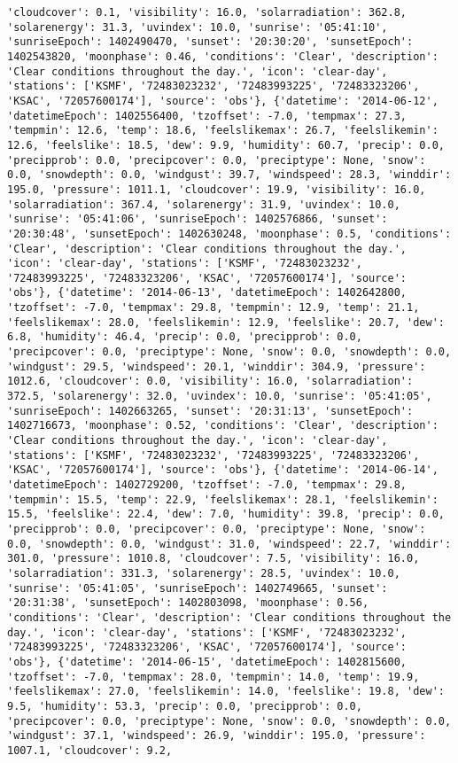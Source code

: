 \documentclass[
  letterpaper,
  DIV=11,
  numbers=noendperiod]{scrartcl}
\begin{document}
\begin{verbatim}
'cloudcover': 0.1, 'visibility': 16.0, 'solarradiation': 362.8, 'solarenergy': 31.3, 'uvindex': 10.0, 'sunrise': '05:41:10', 'sunriseEpoch': 1402490470, 'sunset': '20:30:20', 'sunsetEpoch': 1402543820, 'moonphase': 0.46, 'conditions': 'Clear', 'description': 'Clear conditions throughout the day.', 'icon': 'clear-day', 'stations': ['KSMF', '72483023232', '72483993225', '72483323206', 'KSAC', '72057600174'], 'source': 'obs'}, {'datetime': '2014-06-12', 'datetimeEpoch': 1402556400, 'tzoffset': -7.0, 'tempmax': 27.3, 'tempmin': 12.6, 'temp': 18.6, 'feelslikemax': 26.7, 'feelslikemin': 12.6, 'feelslike': 18.5, 'dew': 9.9, 'humidity': 60.7, 'precip': 0.0, 'precipprob': 0.0, 'precipcover': 0.0, 'preciptype': None, 'snow': 0.0, 'snowdepth': 0.0, 'windgust': 39.7, 'windspeed': 28.3, 'winddir': 195.0, 'pressure': 1011.1, 'cloudcover': 19.9, 'visibility': 16.0, 'solarradiation': 367.4, 'solarenergy': 31.9, 'uvindex': 10.0, 'sunrise': '05:41:06', 'sunriseEpoch': 1402576866, 'sunset': '20:30:48', 'sunsetEpoch': 1402630248, 'moonphase': 0.5, 'conditions': 'Clear', 'description': 'Clear conditions throughout the day.', 'icon': 'clear-day', 'stations': ['KSMF', '72483023232', '72483993225', '72483323206', 'KSAC', '72057600174'], 'source': 'obs'}, {'datetime': '2014-06-13', 'datetimeEpoch': 1402642800, 'tzoffset': -7.0, 'tempmax': 29.8, 'tempmin': 12.9, 'temp': 21.1, 'feelslikemax': 28.0, 'feelslikemin': 12.9, 'feelslike': 20.7, 'dew': 6.8, 'humidity': 46.4, 'precip': 0.0, 'precipprob': 0.0, 'precipcover': 0.0, 'preciptype': None, 'snow': 0.0, 'snowdepth': 0.0, 'windgust': 29.5, 'windspeed': 20.1, 'winddir': 304.9, 'pressure': 1012.6, 'cloudcover': 0.0, 'visibility': 16.0, 'solarradiation': 372.5, 'solarenergy': 32.0, 'uvindex': 10.0, 'sunrise': '05:41:05', 'sunriseEpoch': 1402663265, 'sunset': '20:31:13', 'sunsetEpoch': 1402716673, 'moonphase': 0.52, 'conditions': 'Clear', 'description': 'Clear conditions throughout the day.', 'icon': 'clear-day', 'stations': ['KSMF', '72483023232', '72483993225', '72483323206', 'KSAC', '72057600174'], 'source': 'obs'}, {'datetime': '2014-06-14', 'datetimeEpoch': 1402729200, 'tzoffset': -7.0, 'tempmax': 29.8, 'tempmin': 15.5, 'temp': 22.9, 'feelslikemax': 28.1, 'feelslikemin': 15.5, 'feelslike': 22.4, 'dew': 7.0, 'humidity': 39.8, 'precip': 0.0, 'precipprob': 0.0, 'precipcover': 0.0, 'preciptype': None, 'snow': 0.0, 'snowdepth': 0.0, 'windgust': 31.0, 'windspeed': 22.7, 'winddir': 301.0, 'pressure': 1010.8, 'cloudcover': 7.5, 'visibility': 16.0, 'solarradiation': 331.3, 'solarenergy': 28.5, 'uvindex': 10.0, 'sunrise': '05:41:05', 'sunriseEpoch': 1402749665, 'sunset': '20:31:38', 'sunsetEpoch': 1402803098, 'moonphase': 0.56, 'conditions': 'Clear', 'description': 'Clear conditions throughout the day.', 'icon': 'clear-day', 'stations': ['KSMF', '72483023232', '72483993225', '72483323206', 'KSAC', '72057600174'], 'source': 'obs'}, {'datetime': '2014-06-15', 'datetimeEpoch': 1402815600, 'tzoffset': -7.0, 'tempmax': 28.0, 'tempmin': 14.0, 'temp': 19.9, 'feelslikemax': 27.0, 'feelslikemin': 14.0, 'feelslike': 19.8, 'dew': 9.5, 'humidity': 53.3, 'precip': 0.0, 'precipprob': 0.0, 'precipcover': 0.0, 'preciptype': None, 'snow': 0.0, 'snowdepth': 0.0, 'windgust': 37.1, 'windspeed': 26.9, 'winddir': 195.0, 'pressure': 1007.1, 'cloudcover': 9.2, 
\end{verbatim}
\end{document}
